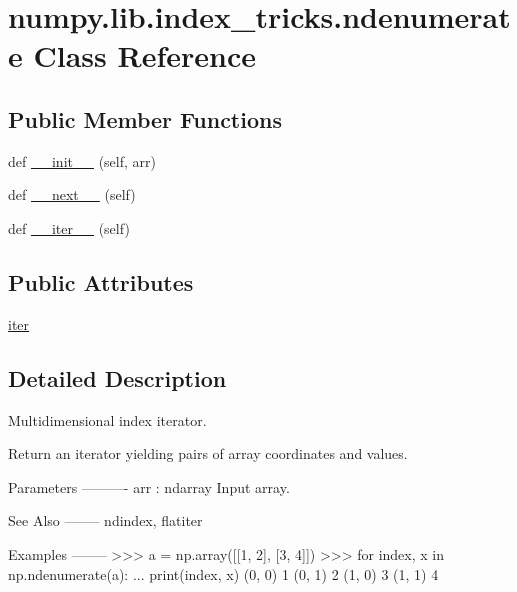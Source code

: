\hypertarget{classnumpy_1_1lib_1_1index__tricks_1_1ndenumerate}{}\section{numpy.\+lib.\+index\+\_\+tricks.\+ndenumerate Class Reference}
\label{classnumpy_1_1lib_1_1index__tricks_1_1ndenumerate}
\subsection*{Public Member Functions}
\begin{DoxyCompactItemize}
\item 
def \hyperlink{classnumpy_1_1lib_1_1index__tricks_1_1ndenumerate_af49257d1c1aa4e76d8bbb146e8d4ff87}{\+\_\+\+\_\+init\+\_\+\+\_\+} (self, arr)
\item 
def \hyperlink{classnumpy_1_1lib_1_1index__tricks_1_1ndenumerate_a3ea340ebbe7bea8e9a1606d6793efc8a}{\+\_\+\+\_\+next\+\_\+\+\_\+} (self)
\item 
def \hyperlink{classnumpy_1_1lib_1_1index__tricks_1_1ndenumerate_a46423cbbb37e246d0c385aa7bbf5fd84}{\+\_\+\+\_\+iter\+\_\+\+\_\+} (self)
\end{DoxyCompactItemize}
\subsection*{Public Attributes}
\begin{DoxyCompactItemize}
\item 
\hyperlink{classnumpy_1_1lib_1_1index__tricks_1_1ndenumerate_aa6097b451afd6a607c07b4259d43ecd1}{iter}
\end{DoxyCompactItemize}


\subsection{Detailed Description}
\begin{DoxyVerb}Multidimensional index iterator.

Return an iterator yielding pairs of array coordinates and values.

Parameters
----------
arr : ndarray
  Input array.

See Also
--------
ndindex, flatiter

Examples
--------
>>> a = np.array([[1, 2], [3, 4]])
>>> for index, x in np.ndenumerate(a):
...     print(index, x)
(0, 0) 1
(0, 1) 2
(1, 0) 3
(1, 1) 4\end{DoxyVerb}
 

